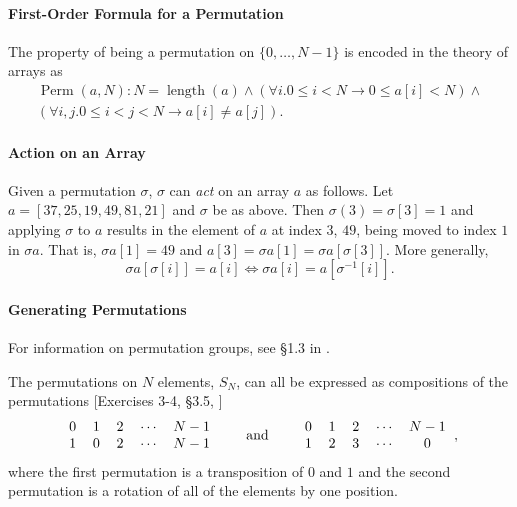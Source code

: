\documentclass{llncs}
\DeclareMathOperator{\Perm}{Perm}
\DeclareMathOperator{\len}{length}
\begin{document}
\paragraph{First-Order Formula for a Permutation}
The property of being a permutation on \(\{0, \dotsc, N-1\}\) is encoded in the theory of arrays as
\begin{multline*}\Perm(a, N): N = \len(a) \wedge (\forall i. 0 \leq i < N \rightarrow 0 \leq a[i] < N) \wedge\\(\forall i,j. 0 \leq i < j < N \rightarrow a[i] \not= a[j]).\end{multline*}

\paragraph{Action on an Array}

Given a permutation \(\sigma\), \(\sigma\) can {\it act} on an array \(a\) as follows.  Let \(a = [37, 25, 19, 49, 81, 21]\) and \(\sigma\) be as above.  Then \(\sigma(3) = \sigma[3] = 1\) and applying \(\sigma\) to \(a\) results in the element of \(a\) at index \(3\), \(49\), being moved to index \(1\) in \(\sigma a\).  That is, \(\sigma a[1] = 49\) and \(a[3] = \sigma a[1] = \sigma a[\sigma[3]]\).  More generally,
\begin{equation}
\sigma a[\sigma[i]] = a[i] \Longleftrightarrow \sigma a[i] = a[\sigma^{-1}[i]].
\label{action}
\end{equation}

\paragraph{Generating Permutations}
For information on permutation groups, see \S1.3 in \cite{dummitfoote}.

\makeatletter
\renewcommand{\@cite}[1]{#1}
\makeatother
The permutations on \(N\) elements, \(S_{N}\), can all be expressed as compositions of the permutations [Exercises 3-4, \S3.5, \cite{dummitfoote}]
\[\begin{tabular}{ccccc}
0 & 1 & 2 & \(\dotsm\) & \(N-1\)\\
1 & 0 & 2 & \(\dotsm\) & \(N-1\)
\end{tabular}
\qquad\textrm{and}\qquad
\begin{tabular}{ccccc}
0 & 1 & 2 & \(\dotsm\) & \(N-1\)\\
1 & 2 & 3 & \(\dotsm\) & 0
\end{tabular},\]
\makeatletter
\renewcommand{\@cite}[1]{[#1]}
\makeatother
where the first permutation is a transposition of \(0\) and \(1\) and the second permutation is a rotation of all of the elements by one position.
\end{document}
